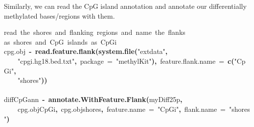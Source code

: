 \documentclass{article}
\makeatletter
\newcommand{\hlfunctioncall}[1]{\textcolor[rgb]{.5,0,.33}{\textbf{#1}}}%
\newcommand{\hlstring}[1]{\textcolor[rgb]{.6,.6,1}{#1}}%
\newcommand{\hlkeyword}[1]{\textbf{#1}}%
\newcommand{\hlargument}[1]{\textcolor[rgb]{.69,.25,.02}{#1}}%
\newcommand{\hlcomment}[1]{\textcolor[rgb]{.18,.6,.34}{#1}}%
\newcommand{\hlassignement}[1]{\textbf{#1}}%
\newcommand{\hlsymbol}[1]{#1}%
\newcommand{\hlstd}[1]{\textcolor[rgb]{0,0,0}{#1}}%
\newenvironment{kframe}{%
 \def\FrameCommand##1{\hskip\@totalleftmargin \hskip-\fboxsep
 \colorbox{shadecolor}{##1}\hskip-\fboxsep
     \hskip-\linewidth \hskip-\@totalleftmargin \hskip\columnwidth}%
 \MakeFramed {\advance\hsize-\width
   \@totalleftmargin\z@ \linewidth\hsize
   \@setminipage}}%
 {\par\unskip\endMakeFramed}
\newenvironment{knitrout}{}{} %
\makeatother
\begin{document}
Similarly, we can read the CpG island annotation and annotate our differentially methylated bases/regions with them.

\begin{knitrout}
\color{fgcolor}\begin{kframe}
\begin{flushleft}
\ttfamily\noindent
\hlcomment{\usebox{\hlnormalsizeboxhash}{\ }read{\ }the{\ }shores{\ }and{\ }flanking{\ }regions{\ }and{\ }name{\ }the{\ }flanks}\hspace*{\fill}\\
\hlstd{}\hlcomment{\usebox{\hlnormalsizeboxhash}{\ }as{\ }shores{\ }and{\ }CpG{\ }islands{\ }as{\ }CpGi}\hspace*{\fill}\\
\hlstd{}\hlsymbol{cpg.obj}{\ }\hlassignement{\usebox{\hlnormalsizeboxlessthan}-}{\ }\hlfunctioncall{read.feature.flank}\hlkeyword{(}\hlfunctioncall{system.file}\hlkeyword{(}\hlstring{"{}extdata"{}}\hlkeyword{,}\hspace*{\fill}\\
\hlstd{}{\ }{\ }{\ }{\ }\hlstring{"{}cpgi.hg18.bed.txt"{}}\hlkeyword{,}{\ }\hlargument{package}{\ }\hlargument{=}{\ }\hlstring{"{}methylKit"{}}\hlkeyword{)}\hlkeyword{,}{\ }\hlargument{feature.flank.name}{\ }\hlargument{=}{\ }\hlfunctioncall{c}\hlkeyword{(}\hlstring{"{}CpGi"{}}\hlkeyword{,}\hspace*{\fill}\\
\hlstd{}{\ }{\ }{\ }{\ }\hlstring{"{}shores"{}}\hlkeyword{)}\hlkeyword{)}\hspace*{\fill}\\
\hlstd{}\hlcomment{\usebox{\hlnormalsizeboxhash}}\hspace*{\fill}\\
\hlstd{}\hlsymbol{diffCpGann}{\ }\hlassignement{\usebox{\hlnormalsizeboxlessthan}-}{\ }\hlfunctioncall{annotate.WithFeature.Flank}\hlkeyword{(}\hlsymbol{myDiff25p}\hlkeyword{,}\hspace*{\fill}\\
\hlstd{}{\ }{\ }{\ }{\ }\hlsymbol{cpg.obj}\hlkeyword{\usebox{\hlnormalsizeboxdollar}}\hlsymbol{CpGi}\hlkeyword{,}{\ }\hlsymbol{cpg.obj}\hlkeyword{\usebox{\hlnormalsizeboxdollar}}\hlsymbol{shores}\hlkeyword{,}{\ }\hlargument{feature.name}{\ }\hlargument{=}{\ }\hlstring{"{}CpGi"{}}\hlkeyword{,}{\ }\hlargument{flank.name}{\ }\hlargument{=}{\ }\hlstring{"{}shores"{}}\hlkeyword{)}\mbox{}
\normalfont
\end{flushleft}
\end{kframe}
\end{knitrout}
\end{document}
